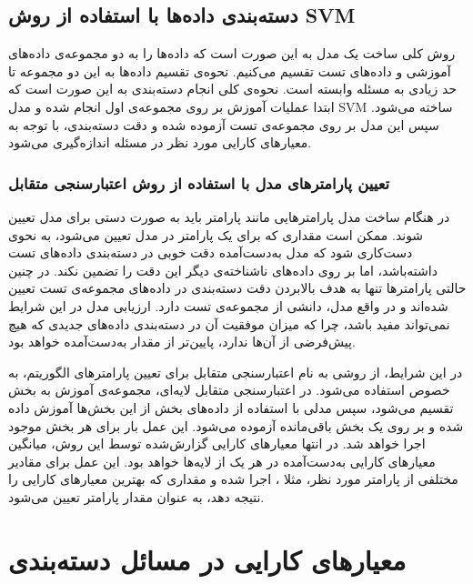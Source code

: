 \subsection{دسته‌بندی داده‌ها با استفاده از روش SVM}
روش کلی ساخت یک مدل  به این صورت است که داده‌ها را به دو مجموعه‌ی داده‌های آموزشی و داده‌های تست تقسیم می‌کنیم. نحوه‌ی تقسیم داده‌ها به این دو مجموعه تا حد زیادی به مسئله وابسته است. نحوه‌ی کلی انجام دسته‌بندی به این صورت است که ابتدا عملیات آموزش بر روی مجموعه‌ی اول انجام شده و مدل SVM ساخته می‌شود. سپس این مدل بر روی مجموعه‌ی تست آزموده شده و دقت دسته‌بندی، با توجه به معیارهای کارایی مورد نظر در مسئله اندازه‌گیری می‌شود.

 \subsubsection{تعیین پارامترهای مدل با استفاده از روش اعتبارسنجی متقابل }
 در هنگام ساخت مدل  پارامترهایی مانند پارامتر  باید به صورت دستی برای مدل تعیین شوند. ممکن است مقداری که برای یک پارامتر در مدل تعیین می‌شود، به نحوی دست‌کاری شود که مدل به‌دست‌آمده دقت خوبی در دسته‌بندی داده‌های تست داشته‌باشد، اما بر روی داده‌های ناشناخته‌ی دیگر این دقت را تضمین نکند. در چنین حالتی پارامترها تنها به هدف بالابردن دقت دسته‌بندی در داده‌های مجموعه‌ی تست تعیین شده‌اند و در واقع مدل، دانشی از مجموعه‌ی تست دارد. ارزیابی مدل در این شرایط نمی‌تواند مفید باشد، چرا که میزان موفقیت آن در دسته‌بندی داده‌های جدیدی که هیچ پیش‌فرضی از آن‌ها ندارد، پایین‌تر از مقدار به‌دست‌آمده خواهد بود.

در این شرایط، از روشی به نام اعتبارسنجی متقابل برای تعیین پارامترهای الگوریتم، به خصوص  استفاده می‌شود. در اعتبارسنجی متقابل  لایه‌ای، مجموعه‌ی آموزش به  بخش تقسیم می‌شود، سپس مدلی با استفاده از داده‌های  بخش از این بخش‌ها آموزش داده شده و بر روی یک بخش باقی‌مانده آزموده می‌شود. این عمل  بار برای هر  بخش موجود اجرا خواهد شد. در انتها معیارهای کارایی گزارش‌شده توسط این روش، میانگین معیارهای کارایی به‌دست‌آمده  در هر یک از لایه‌ها خواهد بود. این عمل برای مقادیر مختلفی از پارامتر مورد نظر، مثلا ، اجرا شده و مقداری که بهترین معیارهای کارایی را نتیجه دهد، به عنوان مقدار پارامتر تعیین می‌شود.


\section{معیارهای کارایی در مسائل دسته‌بندی}

